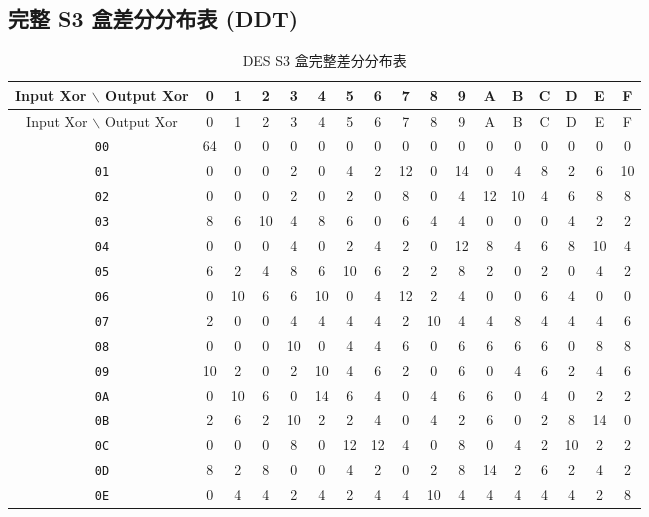 \subsection{完整 S3 盒差分分布表 (DDT)}
\begin{center}
\begin{small}
\begin{longtable}{c|cccccccccccccccc}
\caption{DES S3 盒完整差分分布表} \\
\toprule
Input Xor $\backslash$ Output Xor & 0 & 1 & 2 & 3 & 4 & 5 & 6 & 7 & 8 & 9 & A & B & C & D & E & F \\ \midrule
\endfirsthead

\toprule
Input Xor $\backslash$ Output Xor  & 0 & 1 & 2 & 3 & 4 & 5 & 6 & 7 & 8 & 9 & A & B & C & D & E & F \\ \midrule
\endhead
\texttt{00} & 64 & 0 & 0 & 0 & 0 & 0 & 0 & 0 & 0 & 0 & 0 & 0 & 0 & 0 & 0 & 0 \\
\texttt{01} & 0 & 0 & 0 & 2 & 0 & 4 & 2 & 12 & 0 & 14 & 0 & 4 & 8 & 2 & 6 & 10 \\
\texttt{02} & 0 & 0 & 0 & 2 & 0 & 2 & 0 & 8 & 0 & 4 & 12 & 10 & 4 & 6 & 8 & 8 \\
\texttt{03} & 8 & 6 & 10 & 4 & 8 & 6 & 0 & 6 & 4 & 4 & 0 & 0 & 0 & 4 & 2 & 2 \\
\texttt{04} & 0 & 0 & 0 & 4 & 0 & 2 & 4 & 2 & 0 & 12 & 8 & 4 & 6 & 8 & 10 & 4 \\
\texttt{05} & 6 & 2 & 4 & 8 & 6 & 10 & 6 & 2 & 2 & 8 & 2 & 0 & 2 & 0 & 4 & 2 \\
\texttt{06} & 0 & 10 & 6 & 6 & 10 & 0 & 4 & 12 & 2 & 4 & 0 & 0 & 6 & 4 & 0 & 0 \\
\texttt{07} & 2 & 0 & 0 & 4 & 4 & 4 & 4 & 2 & 10 & 4 & 4 & 8 & 4 & 4 & 4 & 6 \\
\texttt{08} & 0 & 0 & 0 & 10 & 0 & 4 & 4 & 6 & 0 & 6 & 6 & 6 & 6 & 0 & 8 & 8 \\
\texttt{09} & 10 & 2 & 0 & 2 & 10 & 4 & 6 & 2 & 0 & 6 & 0 & 4 & 6 & 2 & 4 & 6 \\
\texttt{0A} & 0 & 10 & 6 & 0 & 14 & 6 & 4 & 0 & 4 & 6 & 6 & 0 & 4 & 0 & 2 & 2 \\
\texttt{0B} & 2 & 6 & 2 & 10 & 2 & 2 & 4 & 0 & 4 & 2 & 6 & 0 & 2 & 8 & 14 & 0 \\
\texttt{0C} & 0 & 0 & 0 & 8 & 0 & 12 & 12 & 4 & 0 & 8 & 0 & 4 & 2 & 10 & 2 & 2 \\
\texttt{0D} & 8 & 2 & 8 & 0 & 0 & 4 & 2 & 0 & 2 & 8 & 14 & 2 & 6 & 2 & 4 & 2 \\
\texttt{0E} & 0 & 4 & 4 & 2 & 4 & 2 & 4 & 4 & 10 & 4 & 4 & 4 & 4 & 4 & 2 & 8 \\

\end{longtable}
\end{small}
\end{center}
